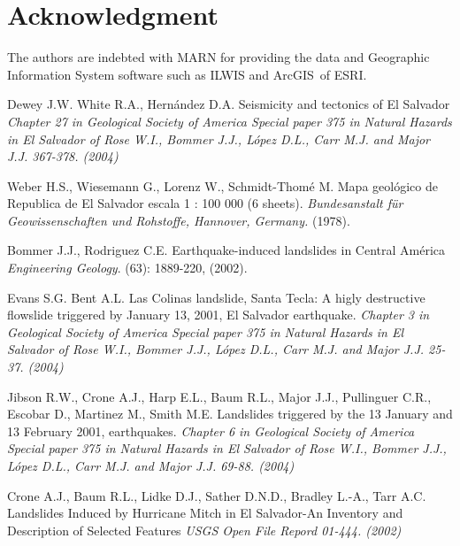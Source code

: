 \documentclass[11pt,twoside]{rmta2010eng}%
\begin{document}
\section{Acknowledgment}   
The authors are indebted with MARN for providing the data and Geographic Information System software such as ILWIS and ArcGIS\textregistered \  of ESRI.



\begin{thebibliography}{99}




Dewey J.W. White R.A., Hern\'{a}ndez D.A.
\newblock Seismicity and tectonics of El Salvador
\newblock \emph{Chapter 27 in Geological Society of America Special paper 375 in Natural Hazards in El Salvador of Rose W.I., Bommer J.J., L\'{o}pez D.L., Carr M.J. and Major J.J. 367-378. (2004)}


Weber H.S., Wiesemann G., Lorenz  W., Schmidt-Thom\'{e} M.
\newblock Mapa geol\'{o}gico de Republica de El Salvador
\newblock escala 1 : 100 000 (6 sheets).
\newblock \emph{ Bundesanstalt f\"ur Geowissenschaften und Rohstoffe, Hannover, Germany.
}
 (1978).


Bommer J.J., Rodriguez C.E.
\newblock Earthquake-induced landslides in Central Am\'{e}rica
\newblock \emph{Engineering Geology}.
(63): 1889-220, (2002).


Evans S.G. Bent A.L.
\newblock Las Colinas landslide, Santa Tecla:  A higly destructive flowslide triggered by January 13, 2001, El Salvador earthquake.
\newblock \emph{Chapter 3 in Geological Society of America Special paper 375 in Natural Hazards in El Salvador of Rose W.I., Bommer J.J., L\'{o}pez D.L., Carr M.J. and Major J.J. 25-37. (2004)}



Jibson R.W., Crone A.J., Harp E.L., Baum R.L., Major J.J., Pullinguer C.R., Escobar D., Martinez M., Smith M.E. 
\newblock Landslides triggered by the 13 January and 13 February 2001, earthquakes.
\newblock \emph{ Chapter 6 in Geological Society of America Special paper 375 in Natural Hazards in El Salvador of Rose W.I., Bommer J.J., L\'{o}pez D.L., Carr M.J. and Major J.J. 69-88. (2004)}



Crone A.J., Baum R.L., Lidke D.J., Sather D.N.D., Bradley L.-A., Tarr A.C.
\newblock Landslides Induced by Hurricane Mitch in El Salvador-An Inventory and Description of Selected Features
\newblock \emph{USGS Open File Repord 01-444. (2002)}



\end{thebibliography}
\end{document}
